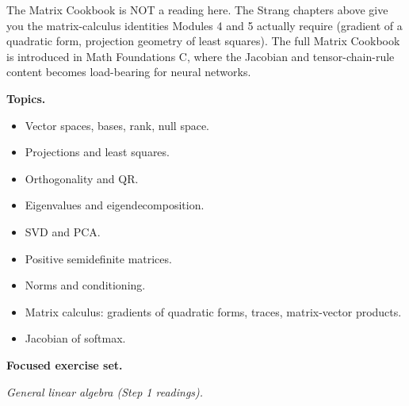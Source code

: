 The Matrix Cookbook is NOT a reading here. The Strang chapters above
give you the matrix-calculus identities Modules 4 and 5 actually require
(gradient of a quadratic form, projection geometry of least squares).
The full Matrix Cookbook is introduced in Math Foundations C, where the
Jacobian and tensor-chain-rule content becomes load-bearing for neural
networks.

\textbf{Topics.}

\begin{itemize}
\tightlist
\item
  Vector spaces, bases, rank, null space.
\item
  Projections and least squares.
\item
  Orthogonality and QR.
\item
  Eigenvalues and eigendecomposition.
\item
  SVD and PCA.
\item
  Positive semidefinite matrices.
\item
  Norms and conditioning.
\item
  Matrix calculus: gradients of quadratic forms, traces, matrix-vector
  products.
\item
  Jacobian of softmax.
\end{itemize}

\textbf{Focused exercise set.}

\emph{General linear algebra (Step 1 readings).}

